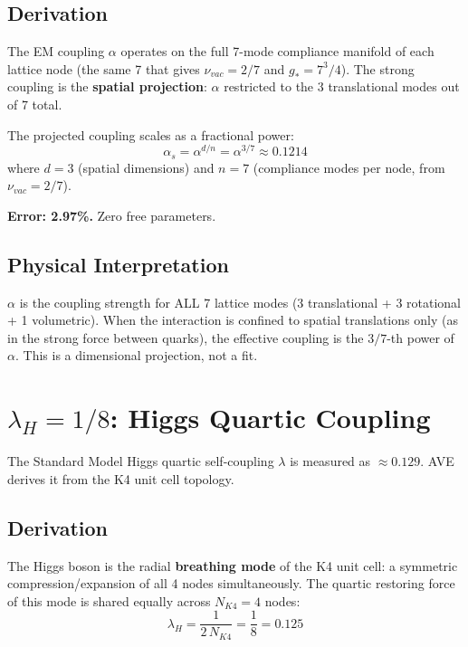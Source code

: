 \subsection{Derivation}

The EM coupling $\alpha$ operates on the full 7-mode compliance
manifold of each lattice node (the same 7 that gives $\nu_{vac} = 2/7$
and $g_* = 7^3/4$).  The strong coupling is the \textbf{spatial
projection}: $\alpha$ restricted to the 3 translational modes
out of 7 total.

The projected coupling scales as a fractional power:
\begin{equation}
    \boxed{\alpha_s = \alpha^{d/n} = \alpha^{3/7} \approx 0.1214}
\end{equation}
where $d = 3$ (spatial dimensions) and $n = 7$ (compliance modes
per node, from $\nu_{vac} = 2/7$).

\textbf{Error: 2.97\%.}  Zero free parameters.

\subsection{Physical Interpretation}

$\alpha$ is the coupling strength for ALL 7 lattice modes (3
translational + 3 rotational + 1 volumetric).  When the
interaction is confined to spatial translations only (as in the
strong force between quarks), the effective coupling is the
$3/7$-th power of $\alpha$.  This is a dimensional projection,
not a fit.


\section{$\lambda_H = 1/8$: Higgs Quartic Coupling}
\label{sec:lambda_higgs_derivation}

The Standard Model Higgs quartic self-coupling $\lambda$ is
measured as $\approx 0.129$.  AVE derives it from the K4 unit
cell topology.

\subsection{Derivation}

The Higgs boson is the radial \textbf{breathing mode} of the
K4 unit cell: a symmetric compression/expansion of all 4
nodes simultaneously.  The quartic restoring force of this
mode is shared equally across $N_{K4} = 4$ nodes:
\begin{equation}
    \boxed{\lambda_H = \frac{1}{2\,N_{K4}} = \frac{1}{8} = 0.125}
\end{equation}

